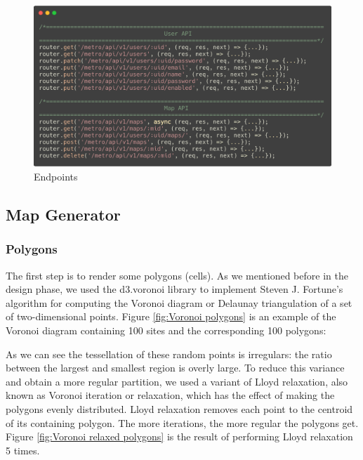 \begin{figure}[htbp]
  \centering
  \includegraphics[width=\textwidth]{section04/assets/Endpoints.png}
  \caption{Endpoints}
  \label{fig:Endpoints}
\end{figure}

\subsection{Map Generator}
\subsubsection{Polygons}
The first step is to render some polygons (cells). As we mentioned before in the design phase, we used the d3.voronoi library to implement Steven J. Fortune’s algorithm for computing the Voronoi diagram or Delaunay triangulation of a set of two-dimensional points. Figure \ref{fig:Voronoi polygons} is an example of the Voronoi diagram containing 100 sites and the corresponding 100 polygons:

As we can see the tessellation of these random points is irregulars: the ratio between the largest and smallest region is overly large. To reduce this variance and obtain a more regular partition, we used a variant of Lloyd relaxation, also known as Voronoi iteration or relaxation, which has the effect of making the polygons evenly distributed. Lloyd relaxation removes each point to the centroid of its containing polygon. The more iterations, the more regular the polygons get. Figure \ref{fig:Voronoi relaxed polygons} is the result of performing Lloyd relaxation 5 times.

